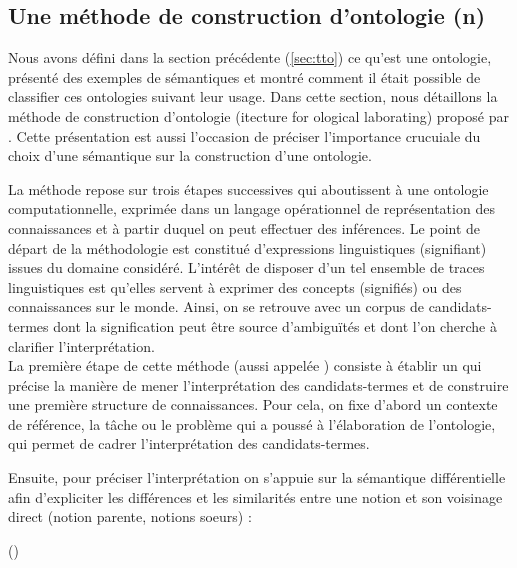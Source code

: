 \subsection{Une méthode de construction d'ontologie (n)}\label{sec:construction}
Nous avons défini dans la section précédente (\ref{sec:tto}) ce qu'est une ontologie,  présenté des exemples de sémantiques et montré comment il était possible de classifier ces ontologies suivant leur usage. 
Dans cette section, nous détaillons la méthode de construction d'ontologie  (itecture for ological laborating) proposé par \cite{Bachimont2000a}.
Cette présentation est aussi l'occasion de préciser l'importance crucuiale du choix d'une sémantique sur la construction d'une ontologie.

La méthode repose sur trois étapes successives qui aboutissent à une ontologie computationnelle, exprimée dans un langage opérationnel de représentation des connaissances et à partir duquel on peut effectuer des inférences. 
Le point de départ de la méthodologie est constitué d'expressions linguistiques (signifiant) issues du domaine considéré.
L'intérêt de disposer d'un tel ensemble de traces linguistiques est qu'elles servent à exprimer des concepts (signifiés) ou des connaissances sur le monde. 
Ainsi, on se retrouve avec un corpus de candidats-termes dont la signification peut être source d'ambiguïtés et dont l'on cherche à clarifier l'interprétation.\\

\g{[1.]} La première étape de cette méthode (aussi appelée ) consiste à établir un   qui précise la manière de mener l'interprétation des candidats-termes et de construire une première structure de connaissances. 
Pour cela, on fixe d'abord un contexte de référence, la tâche ou le problème qui a poussé à l'élaboration de l'ontologie, qui permet de cadrer l'interprétation des candidats-termes.

Ensuite, pour préciser l'interprétation on s'appuie sur la sémantique différentielle afin d'expliciter les différences et les similarités entre une notion et son voisinage direct (notion parente, notions soeurs) : 

	 (\cite[p.139]{bachimont:icc})

